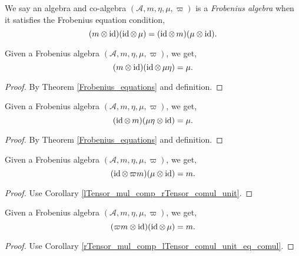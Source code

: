  \begin{definition}\label{FrobeniusAlgebra}\leanok
  We say an algebra and co-algebra $(\mathcal{A},m,\eta,\mu,\varpi)$ is a \textit{Frobenius algebra} when it satisfies the Frobenius equation condition,
  \[(m\otimes\operatorname{id})(\operatorname{id}\otimes\,\mu)=(\operatorname{id}\otimes\,m)(\mu\otimes\operatorname{id}).\]
 \end{definition}

 \begin{corollary}\label{rTensor_mul_comp_lTensor_comul_unit_eq_comul}
  \leanok
  Given a Frobenius algebra $(\mathcal{A},m,\eta,\mu,\varpi)$, we get,
  \[(m\otimes\operatorname{id})(\operatorname{id}\otimes\,\mu\eta)=\mu.\]
 \end{corollary}
 \begin{proof}\leanok
  By Theorem \ref{Frobenius_equations} and definition.
 \end{proof}

 \begin{corollary}\label{lTensor_mul_comp_rTensor_comul_unit}
  Given a Frobenius algebra $(\mathcal{A},m,\eta,\mu,\varpi)$, we get,
  \[(\operatorname{id}\otimes\,m)(\mu{\eta}\otimes\operatorname{id})=\mu.\]
 \end{corollary}
 \begin{proof}\leanok
  By Theorem \ref{Frobenius_equations} and definition.
 \end{proof}

 \begin{corollary}\label{lTensor_counit_mul_comp_rTensor_comul}
  \leanok
  Given a Frobenius algebra $(\mathcal{A},m,\eta,\mu,\varpi)$, we get,
  \[(\operatorname{id}\otimes\,\varpi m)(\mu\otimes\operatorname{id})=m.\]
 \end{corollary}
 \begin{proof}\leanok
  Use Corollary \ref{lTensor_mul_comp_rTensor_comul_unit}.
 \end{proof}
 \begin{corollary}\label{rTensor_counit_mul_comp_lTensor_comul}
  \leanok
  Given a Frobenius algebra $(\mathcal{A},m,\eta,\mu,\varpi)$, we get,
  \[(\varpi m\otimes\operatorname{id})(\operatorname{id}\otimes\,\mu)=m.\]
 \end{corollary}
 \begin{proof}\leanok
  Use Corollary \ref{rTensor_mul_comp_lTensor_comul_unit_eq_comul}.
 \end{proof}

